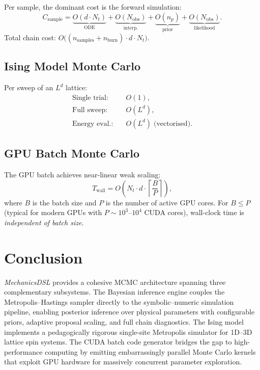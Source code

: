 \documentclass[11pt,letterpaper,twocolumn]{article}
\newcommand{\pkg}[1]{\textit{#1}}
\theoremstyle{definition}
\begin{document}
Per sample, the dominant cost is the forward simulation:
\begin{equation}
  C_{\mathrm{sample}} = \underbrace{O(d\cdot N_t)}_{\text{ODE}} + \underbrace{O(N_{\mathrm{obs}})}_{\text{interp.}} + \underbrace{O(n_p)}_{\text{prior}} + \underbrace{O(N_{\mathrm{obs}})}_{\text{likelihood}}.
\end{equation}
Total chain cost: $O\big((n_{\mathrm{samples}} + n_{\mathrm{burn}}) \cdot d \cdot N_t\big)$.

\subsection{Ising Model Monte Carlo}

Per sweep of an $L^d$ lattice:
\begin{align}
  \text{Single trial:}  &\quad O(1), \\
  \text{Full sweep:}    &\quad O(L^d), \\
  \text{Energy eval.:}  &\quad O(L^d) \;\text{(vectorised)}.
\end{align}

\subsection{GPU Batch Monte Carlo}

The GPU batch achieves near-linear weak scaling:
\begin{equation}
  T_{\mathrm{wall}} = O\!\left(N_t \cdot d \cdot \left\lceil \frac{B}{P}\right\rceil\right),
\end{equation}
where $B$ is the batch size and $P$ is the number of active GPU cores.  For $B \le P$ (typical for modern GPUs with $P \sim 10^3$--$10^4$ CUDA cores), wall-clock time is \emph{independent of batch size}.

\section{Conclusion}\label{sec:conclusion}

\pkg{MechanicsDSL} provides a cohesive MCMC architecture spanning three complementary subsystems.  The Bayesian inference engine couples the Metropolis--Hastings sampler directly to the symbolic--numeric simulation pipeline, enabling posterior inference over physical parameters with configurable priors, adaptive proposal scaling, and full chain diagnostics.  The Ising model implements a pedagogically rigorous single-site Metropolis simulator for 1D--3D lattice spin systems.  The CUDA batch code generator bridges the gap to high-performance computing by emitting embarrassingly parallel Monte Carlo kernels that exploit GPU hardware for massively concurrent parameter exploration.
\end{document}
